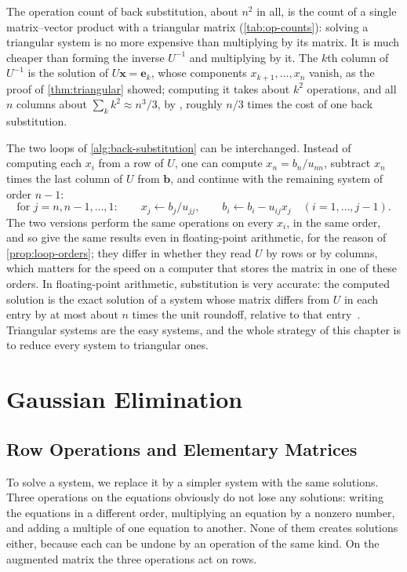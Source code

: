 The operation count of back substitution, about $n^2$ in all, is the count of a single matrix--vector product with a triangular matrix (\cref{tab:op-counts}): solving a triangular system is no more expensive than multiplying by its matrix. It is much cheaper than forming the inverse $U^{-1}$ and multiplying by it. The $k$th column of $U^{-1}$ is the solution of $U\mathbf x=\mathbf e_k$, whose components $x_{k+1},\ldots,x_n$ vanish, as the proof of \cref{thm:triangular} showed; computing it takes about $k^2$ operations, and all $n$ columns about $\sum_kk^2\approx n^3/3$, by , roughly $n/3$ times the cost of one back substitution.

The two loops of \cref{alg:back-substitution} can be interchanged. Instead of computing each $x_i$ from a row of $U$, one can compute $x_n=b_n/u_{nn}$, subtract $x_n$ times the last column of $U$ from $\mathbf b$, and continue with the remaining system of order $n-1$:
\[
\text{for }j=n,n-1,\ldots,1:\qquad x_j\gets b_j/u_{jj},\qquad b_i\gets b_i-u_{ij}x_j\quad(i=1,\ldots,j-1).
\]
The two versions perform the same operations on every $x_i$, in the same order, and so give the same results even in floating-point arithmetic, for the reason of \cref{prop:loop-orders}; they differ in whether they read $U$ by rows or by columns, which matters for the speed on a computer that stores the matrix in one of these orders. In floating-point arithmetic, substitution is very accurate: the computed solution is the exact solution of a system whose matrix differs from $U$ in each entry by at most about $n$ times the unit roundoff, relative to that entry~\cite[Chap.~8]{higham2002accuracy}. Triangular systems are the easy systems, and the whole strategy of this chapter is to reduce every system to triangular ones.

\section{Gaussian Elimination}
\label{sec:elimination}

\subsection{Row Operations and Elementary Matrices}

To solve a system, we replace it by a simpler system with the same solutions. Three operations on the equations obviously do not lose any solutions: writing the equations in a different order, multiplying an equation by a nonzero number, and adding a multiple of one equation to another. None of them creates solutions either, because each can be undone by an operation of the same kind. On the augmented matrix the three operations act on rows.


